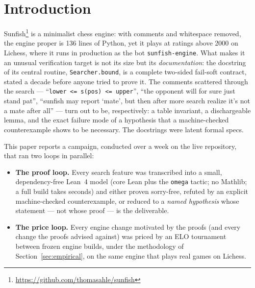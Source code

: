 \documentclass[11pt]{article}
\theoremstyle{plain}
\theoremstyle{definition}
\theoremstyle{remark}
\begin{document}
\section{Introduction}
\label{sec:intro}

Sunfish\footnote{\url{https://github.com/thomasahle/sunfish}} is a
minimalist chess engine: with comments and whitespace removed, the
engine proper is 136 lines of Python, yet it plays at ratings above 2000
on Lichess, where it runs in production as the bot
\texttt{sunfish-engine}.  What makes it an unusual verification target
is not its size but its \emph{documentation}: the docstring of its
central routine, \texttt{Searcher.bound}, is a complete two-sided
fail-soft contract, stated a decade before anyone tried to prove it.
The comments scattered through the search --- ``\texttt{lower <= s(pos)
<= upper}'', ``the opponent will for sure just stand pat'', ``sunfish
may report `mate', but then after more search realize it's not a mate
after all'' --- turn out to be, respectively: a table invariant, a
dischargeable lemma, and the exact failure mode of a hypothesis that a
machine-checked counterexample shows to be necessary.  The docstrings
were latent formal specs.

This paper reports a campaign, conducted over a week on the live
repository, that ran two loops in parallel:

\begin{itemize}
  \item \textbf{The proof loop.}  Every search feature was transcribed
    into a small, dependency-free Lean~4 model (core Lean plus the
    \texttt{omega} tactic; no Mathlib; a full build takes seconds) and
    either proven sorry-free, refuted by an explicit machine-checked
    counterexample, or reduced to a \emph{named hypothesis} whose
    statement --- not whose proof --- is the deliverable.
  \item \textbf{The price loop.}  Every engine change motivated by the
    proofs (and every change the proofs advised against) was priced by
    an ELO tournament between frozen engine builds, under the
    methodology of Section~\ref{sec:empirical}, on the same engine that
    plays real games on Lichess.
\end{itemize}
\end{document}
